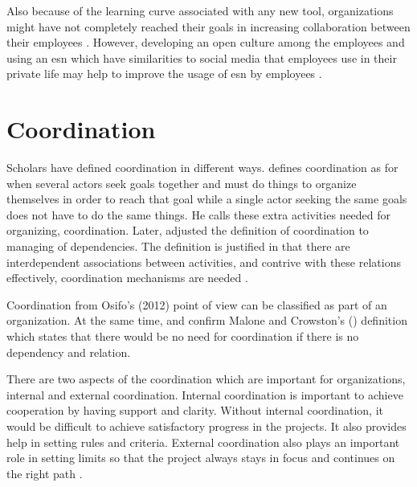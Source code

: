 Also because of the learning curve associated with any new tool, organizations might have not completely reached their goals in increasing collaboration between their employees \citep{Anderson2016}. However, developing an open culture among the employees and using an \ac{esn} which have similarities to social media that employees use in their private life may help to improve the usage of \ac{esn} by employees \citep{Korzynski2014}. 


\chapter{Coordination} \label{coordinering}

Scholars have defined coordination in different ways. \citet{Malone1988} defines coordination as for when several actors seek goals together and must do things to organize themselves in order to reach that goal while a single actor seeking the same goals does not have to do the same things. He calls these extra activities needed for organizing, coordination. Later, \citet{Malone1994} adjusted the definition of coordination to managing of dependencies. The definition is justified in that there are interdependent associations between activities, and contrive with these relations effectively, coordination mechanisms are needed \citep{Deng2007}.

Coordination from Osifo's (2012) point of view can be classified as part of an organization. At the same time, \citep{Beuselinck2007} and \citep{Osifo2012} confirm Malone and Crowston’s (\citeyear{Malone1988}) definition which states that there would be no need for coordination if there is no dependency and relation.

There are two aspects of the coordination which are important for organizations, internal and external coordination. Internal coordination is important to achieve cooperation by having support and clarity. Without internal coordination, it would be difficult to achieve satisfactory progress in the projects. It also provides help in setting rules and criteria. External coordination also plays an important role in setting limits so that the project always stays in focus and continues on the right path \citep{Osifo2012}.

